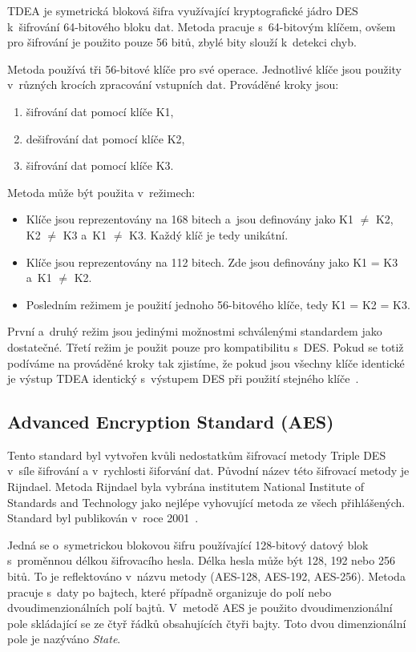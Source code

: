 TDEA je symetrická bloková šifra využívající kryptografické jádro DES k~šifrování 64-bitového bloku
dat. Metoda pracuje s~64-bitovým klíčem, ovšem pro šifrování je použito pouze 56 bitů, zbylé bity
slouží k~detekci chyb. 

Metoda používá tři 56-bitové klíče pro své operace. Jednotlivé klíče jsou použity v~různých krocích
zpracování vstupních dat. Prováděné kroky jsou:
\begin{enumerate}
    \item šifrování dat pomocí klíče K1,
    \item dešifrování dat pomocí klíče K2,
    \item šifrování dat pomocí klíče K3.
\end{enumerate}
Metoda může být použita v~režimech:
\begin{itemize}
    \item Klíče jsou reprezentovány na 168 bitech a~jsou definovány jako K1 $\neq$ K2, K2 $\neq$ K3
        a~K1 $\neq$ K3. Každý klíč je tedy unikátní.
    \item Klíče jsou reprezentovány na 112 bitech. Zde jsou definovány jako K1 = K3 a~K1 $\neq$ K2.
    \item Posledním režimem je použití jednoho 56-bitového klíče, tedy K1 = K2 = K3.
\end{itemize}
První a~druhý režim jsou jedinými možnostmi schválenými standardem jako dostatečné. Třetí režim
je použit pouze pro kompatibilitu s~DES. Pokud se totiž podíváme na prováděné kroky tak zjistíme,
že pokud jsou všechny klíče identické je výstup TDEA identický s~výstupem DES při použití stejného
klíče~\cite{NIST:2012}.

\subsection{Advanced Encryption Standard (AES)}
Tento standard byl vytvořen kvůli nedostatkům šifrovací metody Triple DES v~síle šifrování a
v~rychlosti šiforvání dat. Původní název této šifrovací metody je Rijndael. Metoda Rijndael byla
vybrána institutem National Institute of Standards and Technology jako nejlépe vyhovující metoda ze
všech přihlášených. Standard byl publikován v~roce 2001~\cite{NIST:2001}.

Jedná se o~symetrickou blokovou šifru používající 128-bitový datový blok s~proměnnou délkou
šifrovacího hesla. Délka hesla může být 128, 192 nebo 256 bitů. To je reflektováno v~názvu metody
(AES-128, AES-192, AES-256). Metoda pracuje s~daty po bajtech, které případně organizuje do polí
nebo dvoudimenzionálních polí bajtů. V~metodě AES je použito dvoudimenzionální pole skládající se
ze čtyř řádků obsahujících čtyři bajty. Toto dvou dimenzionální pole je nazýváno {\it State}.

